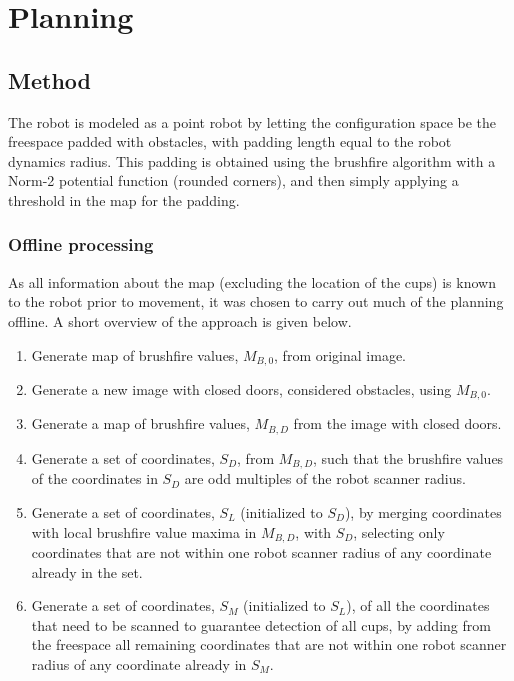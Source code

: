\section{Planning}
\label{sec:planning}
\subsection{Method}

The robot is modeled as a point robot by letting the configuration space be the freespace padded with obstacles,
with padding length equal to the robot dynamics radius.
This padding is obtained using the brushfire algorithm with a Norm-2 potential function (rounded corners),
and then simply applying a threshold in the map for the padding.


\subsubsection{Offline processing}

As all information about the map (excluding the location of the cups) is known to the robot prior to movement,
it was chosen to carry out much of the planning offline.
A short overview of the approach is given below. 

\begin{enumerate}
\item Generate map of brushfire values, \(M_{B,0}\), from original image.
\item Generate a new image with closed doors, considered obstacles, using \(M_{B,0}\).
\item Generate a map of brushfire values, \(M_{B,D}\) from the image with closed doors.
\item Generate a set of coordinates, \(S_{D}\), from \(M_{B,D}\),
such that the brushfire values of the coordinates in \(S_{D}\) are odd multiples of the robot scanner radius.
\item Generate a set of coordinates, \(S_{L}\) (initialized to \(S_{D}\)), by merging coordinates with local brushfire value maxima
in \(M_{B,D}\), with \(S_{D}\), selecting only coordinates that are not within one robot scanner radius
of any coordinate already in the set.
\item Generate a set of coordinates, \(S_{M}\) (initialized to \(S_{L}\)), of all the coordinates that need to be scanned
to guarantee detection of all cups, by adding from the freespace all remaining coordinates
that are not within one robot scanner radius of any coordinate already in \(S_{M}\).
\end{enumerate}




